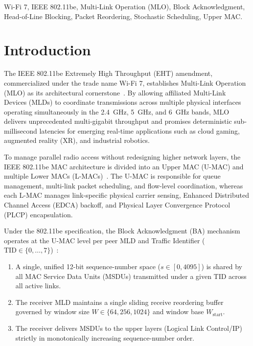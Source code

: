 \documentclass[10pt,journal,compsoc]{IEEEtran}
\begin{document}
{\begin{abstract}
\end{abstract}

\begin{IEEEkeywords}
Wi-Fi 7, IEEE 802.11be, Multi-Link Operation (MLO), Block Acknowledgment, Head-of-Line Blocking, Packet Reordering, Stochastic Scheduling, Upper MAC.
\end{IEEEkeywords}}

\maketitle
\IEEEdisplaynontitleabstractindextext
\IEEEpeerreviewmaketitle

\section{Introduction}
\label{sec:intro}

The IEEE 802.11be Extremely High Throughput (EHT) amendment, commercialized under the trade name Wi-Fi 7, establishes Multi-Link Operation (MLO) as its architectural cornerstone~\cite{ieee80211be2024}. By allowing affiliated Multi-Link Devices (MLDs) to coordinate transmissions across multiple physical interfaces operating simultaneously in the 2.4~GHz, 5~GHz, and 6~GHz bands, MLO delivers unprecedented multi-gigabit throughput and promises deterministic sub-millisecond latencies for emerging real-time applications such as cloud gaming, augmented reality (XR), and industrial robotics.

To manage parallel radio access without redesigning higher network layers, the IEEE 802.11be MAC architecture is divided into an Upper MAC (U-MAC) and multiple Lower MACs (L-MACs)~\cite{choi2025joint}. The U-MAC is responsible for queue management, multi-link packet scheduling, and flow-level coordination, whereas each L-MAC manages link-specific physical carrier sensing, Enhanced Distributed Channel Access (EDCA) backoff, and Physical Layer Convergence Protocol (PLCP) encapsulation.

Under the 802.11be specification, the Block Acknowledgment (BA) mechanism operates at the U-MAC level per peer MLD and Traffic Identifier ($\text{TID} \in \{0, \dots, 7\}$)~\cite{ieee80211be2024}:
\begin{enumerate}
    \item A single, unified 12-bit sequence-number space ($s \in [0, 4095]$) is shared by all MAC Service Data Units (MSDUs) transmitted under a given TID across all active links.
    \item The receiver MLD maintains a single sliding receive reordering buffer governed by window size $W \in \{64, 256, 1024\}$ and window base $W_{\text{start}}$.
    \item The receiver delivers MSDUs to the upper layers (Logical Link Control/IP) strictly in monotonically increasing sequence-number order.
\end{enumerate}
\end{document}
